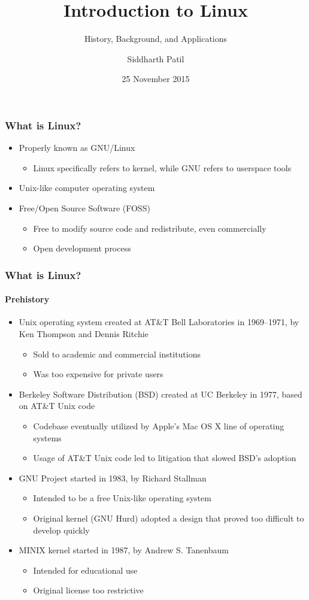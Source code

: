 \documentclass{beamer}
\title{Introduction to Linux}
\subtitle{History, Background, and Applications}
\author{Siddharth Patil}
\date{25 November 2015}
\begin{document}
\frame{\titlepage}

\begin{frame}
  \frametitle{What is Linux?}
  \begin{itemize}
  \item Properly known as GNU/Linux \begin{itemize}
    \item Linux specifically refers to kernel, while GNU refers to userspace tools
    \end{itemize}
  \item Unix-like computer operating system
  \item Free/Open Source Software (FOSS) \begin{itemize}
    \item Free to modify source code and redistribute, even commercially
    \item Open development process
    \end{itemize}
  \end{itemize}
\end{frame}

\begin{frame}
  \frametitle{What is Linux?}
  \framesubtitle{Prehistory}
  \begin{itemize}
  \item Unix operating system created at AT\&T Bell Laboratories in 1969--1971, by Ken Thompson and Dennis Ritchie \begin{itemize}
    \item Sold to academic and commercial institutions
    \item Was too expensive for private users
    \end{itemize} \pause
  \item Berkeley Software Distribution (BSD) created at UC Berkeley in 1977, based on AT\&T Unix code \begin{itemize}
    \item Codebase eventually utilized by Apple's Mac OS X line of operating systems
    \item Usage of AT\&T Unix code led to litigation that slowed BSD's adoption
    \end{itemize} \pause
  \item GNU Project started in 1983, by Richard Stallman \begin{itemize}
    \item Intended to be a free Unix-like operating system
    \item Original kernel (GNU Hurd) adopted a design that proved too difficult to develop quickly
    \end{itemize} \pause
  \item MINIX kernel started in 1987, by Andrew S. Tanenbaum \begin{itemize}
    \item Intended for educational use
    \item Original license too restrictive
    \end{itemize}
  \end{itemize}
\end{frame}
\end{document}
